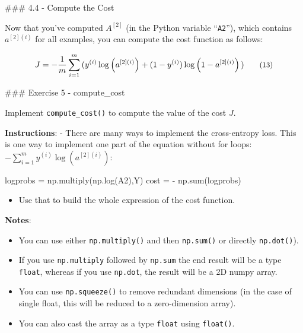 \documentclass[11pt]{article}
\providecommand{\tightlist}{%
      \setlength{\itemsep}{0pt}\setlength{\parskip}{0pt}}
\newenvironment{Shaded}{}{}
\newcommand{\NormalTok}[1]{{#1}}
\newcommand{\OperatorTok}[1]{\textcolor[rgb]{0.40,0.40,0.40}{{#1}}}
\newcommand{\BuiltInTok}[1]{{#1}}
\begin{document}
    \#\#\# 4.4 - Compute the Cost

Now that you've computed \(A^{[2]}\) (in the Python variable
``\texttt{A2}''), which contains \(a^{[2](i)}\) for all examples, you
can compute the cost function as follows:

\[J = - \frac{1}{m} \sum\limits_{i = 1}^{m} \large{(} \small y^{(i)}\log\left(a^{[2] (i)}\right) + (1-y^{(i)})\log\left(1- a^{[2] (i)}\right) \large{)} \small\tag{13}\]

\#\#\# Exercise 5 - compute\_cost

Implement \texttt{compute\_cost()} to compute the value of the cost
\(J\).

\textbf{Instructions}: - There are many ways to implement the
cross-entropy loss. This is one way to implement one part of the
equation without for loops:
\(- \sum\limits_{i=1}^{m} y^{(i)}\log(a^{[2](i)})\):

\begin{Shaded}
\begin{Highlighting}[]
\NormalTok{logprobs }\OperatorTok{=}\NormalTok{ np.multiply(np.log(A2),Y)}
\NormalTok{cost }\OperatorTok{=} \OperatorTok{{-}}\NormalTok{ np.}\BuiltInTok{sum}\NormalTok{(logprobs)          }
\end{Highlighting}
\end{Shaded}

\begin{itemize}
\tightlist
\item
  Use that to build the whole expression of the cost function.
\end{itemize}

\textbf{Notes}:

\begin{itemize}
\tightlist
\item
  You can use either \texttt{np.multiply()} and then \texttt{np.sum()}
  or directly \texttt{np.dot()}).\\
\item
  If you use \texttt{np.multiply} followed by \texttt{np.sum} the end
  result will be a type \texttt{float}, whereas if you use
  \texttt{np.dot}, the result will be a 2D numpy array.\\
\item
  You can use \texttt{np.squeeze()} to remove redundant dimensions (in
  the case of single float, this will be reduced to a zero-dimension
  array).
\item
  You can also cast the array as a type \texttt{float} using
  \texttt{float()}.
\end{itemize}
\end{document}
